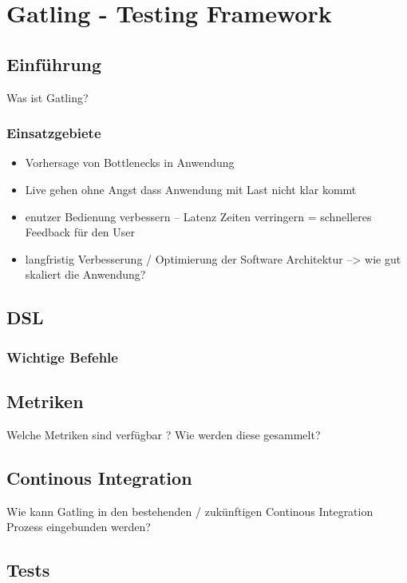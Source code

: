 \chapter{Gatling - Testing Framework}


\section{Einführung}

Was ist Gatling?

\subsection{Einsatzgebiete}


\begin{itemize}
    \item Vorhersage von Bottlenecks in Anwendung 
    \item Live gehen ohne Angst dass Anwendung mit Last nicht klar kommt
    \item enutzer Bedienung verbessern -- Latenz Zeiten verringern = schnelleres Feedback für den User
    \item langfristig Verbesserung / Optimierung der Software Architektur  --> wie gut skaliert die Anwendung?

\end{itemize}

\section{DSL}

\subsection{Wichtige Befehle}


\section{Metriken}

Welche Metriken sind verfügbar ?
Wie werden diese gesammelt?

\section{Continous Integration}

Wie kann Gatling in den bestehenden / zukünftigen Continous Integration Prozess eingebunden werden?


\section{Tests}

